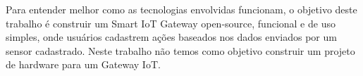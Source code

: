Para entender melhor como as tecnologias envolvidas funcionam, o objetivo deste trabalho é construir um Smart IoT Gateway open-source, funcional e de uso simples, onde usuários cadastrem ações baseados nos dados enviados por um sensor cadastrado. Neste trabalho não temos como objetivo construir um projeto de hardware para um Gateway IoT.
